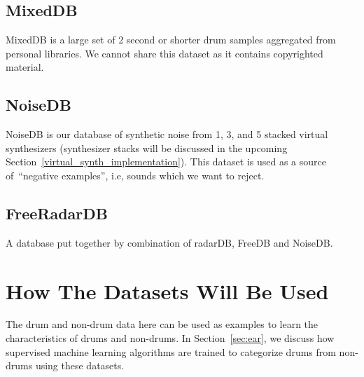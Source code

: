 \documentclass[\main/thesis.tex]{subfiles}
\begin{document}
\subsection{MixedDB}
MixedDB is a large set of 2 second or shorter drum samples aggregated from personal libraries. We cannot share this dataset as it contains copyrighted material. 
\subsection{NoiseDB}
NoiseDB is our database of synthetic noise from 1, 3, and 5 stacked virtual synthesizers (synthesizer stacks will be discussed in the upcoming Section~\ref{virtual_synth_implementation}). This dataset is used as a source of~\enquote{negative examples}, i.e, sounds which we want to reject.
\subsection{FreeRadarDB}
\label{db:memDB}
A database put together by combination of radarDB, FreeDB and NoiseDB.

\section{How The Datasets Will Be Used}
 The drum and non-drum data here can be used as examples to learn the characteristics of drums and non-drums. In Section~\ref{sec:ear}, we discuss how supervised machine learning algorithms are trained to categorize drums from non-drums using these datasets.  
  
\end{document}

